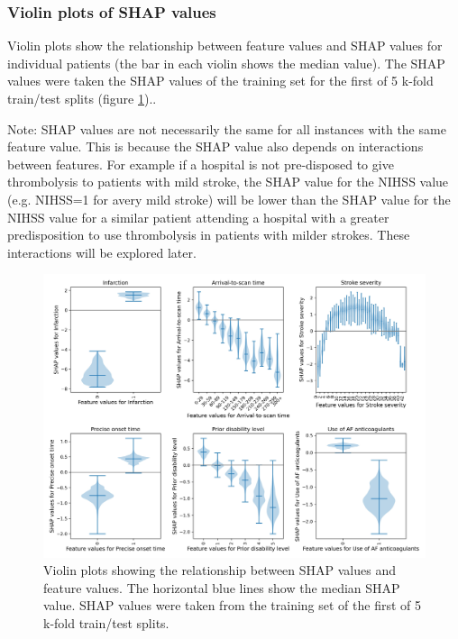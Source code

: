 
\subsubsection{Violin plots of SHAP values}

Violin plots show the relationship between feature values and SHAP values for individual patients (the bar in each violin shows the median value). The SHAP values were taken the SHAP values of the training set for the first of 5 k-fold train/test splits (figure \ref{fig:shap_violin})..

Note: SHAP values are not necessarily the same for all instances with the same feature value. This is because the SHAP value also depends on interactions between features. For example if a hospital is not pre-disposed to give thrombolysis to patients with mild stroke, the SHAP value for the NIHSS value (e.g. NIHSS=1 for  avery mild stroke) will be lower than the SHAP value for the NIHSS value for a similar patient attending a hospital with a greater predisposition to use thrombolysis in patients with milder strokes. These interactions will be explored later.

\begin{figure}
\centering
\includegraphics[width=1\textwidth]{./images/03_xgb_10_features_thrombolysis_shap_violin}
\caption{Violin plots showing the relationship between SHAP values and feature values. The horizontal blue lines show the median SHAP value. SHAP values were taken from the training set of the first of 5 k-fold train/test splits.}
\label{fig:shap_violin}
\end{figure}

